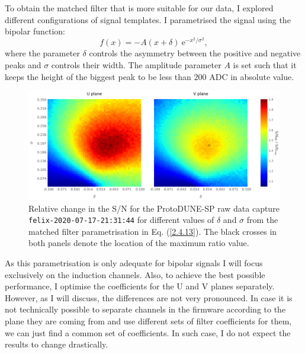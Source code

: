 To obtain the matched filter that is more suitable for our data, I explored different configurations of signal templates. I parametrised the signal using the bipolar function:
\begin{equation}\label{2.4.13}
	f(x) = -A (x + \delta) \ \mathrm{e}^{-x^{2}/\sigma^{2}},
\end{equation}
where the parameter $\delta$ controls the asymmetry between the positive and negative peaks and $\sigma$ controls their width. The amplitude parameter $A$ is set such that it keeps the height of the biggest peak to be less than $200$ ADC in absolute value.

\begin{figure}[t]
	\centering
	\includegraphics[width=1\linewidth]{Images/Matched_Filter/mf_fir_opt.png}
	\caption[Relative change in the S/N for the ProtoDUNE-SP raw data capture for different values of $\delta$ and $\sigma$ from the matched filter parametrisation.]{Relative change in the S/N for the ProtoDUNE-SP raw data capture \texttt{felix-2020-07-17-21:31:44} for different values of $\delta$ and $\sigma$ from the matched filter parametrisation in Eq. (\ref{2.4.13}). The black crosses in both panels denote the location of the maximum ratio value.}
	\label{fig:mf_opt}
\end{figure}

As this parametrisation is only adequate for bipolar signals I will focus exclusively on the induction channels. Also, to achieve the best possible performance, I optimise the coefficients for the U and V planes separately. However, as I will discuss, the differences are not very pronounced. In case it is not technically possible to separate channels in the firmware according to the plane they are coming from and use different sets of filter coefficients for them, we can just find a common set of coefficients. In such case, I do not expect the results to change drastically.

